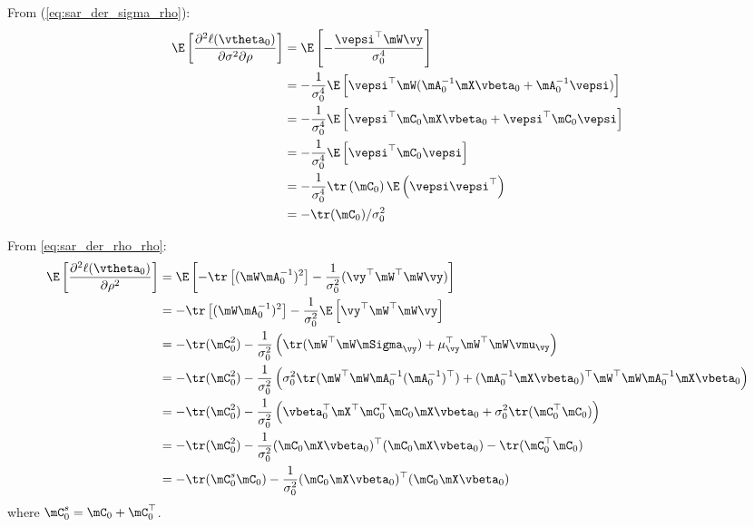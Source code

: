 \documentclass[english,12pt]{book}\usepackage[]{graphicx}\usepackage[]{xcolor}
\begin{document}
\begin{subappendices}
From (\ref{eq:sar_der_sigma_rho}):
\begin{equation}\label{eq:E_der_sigma_rho}
	\begin{aligned}
	\E\left[\frac{\partial^2 \ell(\vtheta_0)}{\partial \sigma^2 \partial \rho}\right] &= \E\left[-\frac{\vepsi^\top\mW\vy}{\sigma^4_0}\right] \\
	& = - \frac{1}{\sigma^4_0}\E\left[\vepsi^\top\mW(\mA^{-1}_0\mX\vbeta_0 + \mA^{-1}_0\vepsi)\right] \\
	& = - \frac{1}{\sigma^4_0}\E\left[\vepsi^\top\mC_0\mX\vbeta_0 + \vepsi^\top\mC_0\vepsi\right] \\
	& = - \frac{1}{\sigma^4_0}\E\left[\vepsi^\top\mC_0\vepsi\right] \\
	& = - \frac{1}{\sigma^4_0}\tr\left(\mC_0\right) \E\left(\vepsi\vepsi^\top\right) \\
	& = - \tr(\mC_0)/\sigma^2_0
	\end{aligned}
\end{equation}

From \eqref{eq:sar_der_rho_rho}:
\begin{equation}\label{eq:E_der_rho_rho}
  \begin{aligned}
\E\left[\frac{\partial^2 \ell(\vtheta_0)}{\partial \rho ^2}\right]  & =  \E\left[- \tr\left[(\mW\mA_0^{-1})^2\right] - \frac{1}{\sigma^2_0}(\vy^{\top}\mW^{\top}\mW\vy)\right] \\
  & =  - \tr\left[(\mW\mA^{-1}_0)^2\right] - \frac{1}{\sigma^2_0} \E\left[\vy^{\top}\mW^{\top}\mW\vy\right] \\
  & = - \tr(\mC_0^2) -\frac{1}{\sigma^2_0} \left(\tr(\mW^{\top}\mW\mSigma_{\vy}) + \mu_{\vy}^\top\mW^{\top}\mW\vmu_{\vy}\right) \\
  & = - \tr(\mC_0^2) -\frac{1}{\sigma^2_0}\left(\sigma_0^2\tr(\mW^{\top}\mW\mA_0^{-1}(\mA_0^{-1})^\top) + (\mA_0^{-1}\mX\vbeta_0)^\top\mW^{\top}\mW\mA_0^{-1}\mX\vbeta_0\right) \\
 & = - \tr(\mC_0^2) - \frac{1}{\sigma^2_0}\left(\vbeta_0^\top\mX^\top\mC_0^\top\mC_0\mX\vbeta_0 + \sigma_0^2\tr(\mC_0^\top\mC_0)\right) \\
 & = - \tr(\mC_0^2) - \frac{1}{\sigma^2_0}(\mC_0\mX\vbeta_0)^\top(\mC_0\mX\vbeta_0) - \tr(\mC_0^\top\mC_0) \\
 & = - \tr(\mC_0^s\mC_0) - \frac{1}{\sigma^2_0}(\mC_0\mX\vbeta_0)^\top(\mC_0\mX\vbeta_0)
\end{aligned}
\end{equation}
%
where $\mC_0^s = \mC_0 + \mC_0^\top$. 


\end{subappendices}
\end{document}
